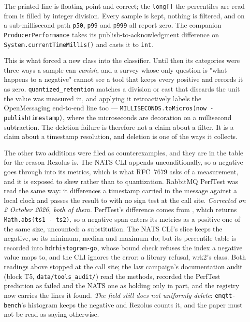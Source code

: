 \documentclass[10pt,journal,onecolumn]{IEEEtran}
\begin{document}
The printed line is floating point and correct; the \texttt{long[]} the percentiles are read
from is filled by integer division. Every sample is kept, nothing is filtered, and on a
sub-millisecond path \texttt{p50}, \texttt{p99} and \texttt{p999} all report zero. The
companion \texttt{ProducerPerformance} takes its publish-to-acknowledgment difference on
\texttt{System.currentTimeMillis()} and casts it to \texttt{int}.

This is what forced a new class into the classifier. Until then its categories were three
ways a sample can \emph{vanish}, and a survey whose only question is "what happens to a
negative" cannot see a tool that keeps every positive and records it as zero.
\texttt{quantized\_retention} matches a division or cast that discards the unit the value was
measured in, and applying it retroactively labels the OpenMessaging end-to-end line too ---
\texttt{MILLISECONDS.toMicros(now - publishTimestamp)}, where the microseconds are decoration
on a millisecond subtraction. The deletion failure is therefore not a claim about a filter. It is a claim
about a timestamp resolution, and deletion is one of the ways it collects.

The other two additions were filed as counterexamples, and they are in the table for the
reason Rezolus is. The NATS CLI appends 
unconditionally, so a negative goes through into its metrics, which is what RFC~7679 asks of a
measurement, and it is exposed to skew rather than to quantization. RabbitMQ PerfTest was read
the same way: it differences a timestamp carried in the message against a local clock and passes
the result to  with no sign test at the call
site. \emph{Corrected on 2 October 2026, both of them.} PerfTest's difference comes from
, which returns \texttt{Math.abs(ts1 - ts2)}, so a
negative span enters its metrics as a positive one of the same size, uncounted: a substitution.
The NATS CLI's slice keeps the negative, so its minimum, median and maximum do; but its
percentile table is recorded into \texttt{hdrhistogram-go}, whose bound check refuses the index a
negative value maps to, and the CLI ignores the error: a library refusal, wrk2's class. Both
readings above stopped at the call site; the law campaign's documentation audit (block T5,
\texttt{data/tools\_audit/}) read the methods, recorded the PerfTest prediction as failed and the
NATS one as holding only in part, and the registry now carries the lines it found. \emph{The
field still does not uniformly delete}: \texttt{emqtt-bench}'s histogram keeps the negative and
Rezolus counts it, and the paper must not be read as saying otherwise.
\end{document}
